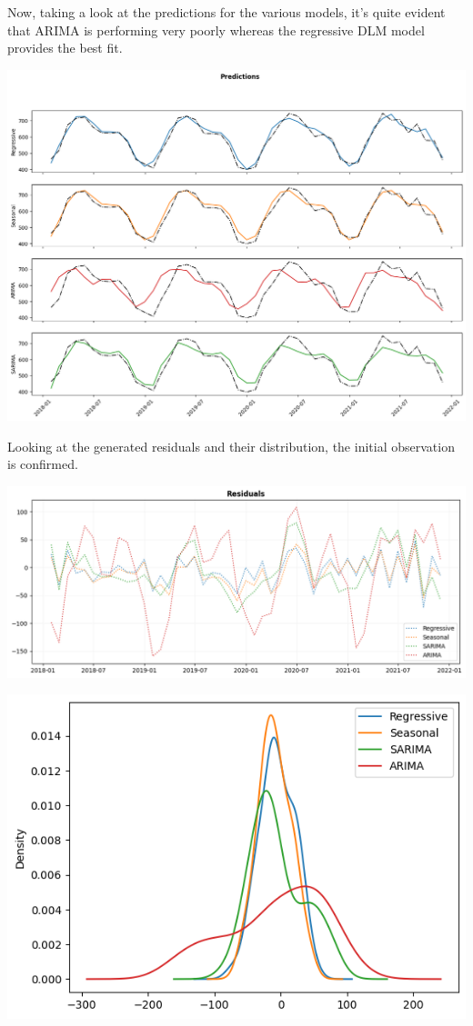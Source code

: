 \documentclass[a4paper,12pt]{article}
\begin{document}
Now, taking a look at the predictions for the various models, it's quite evident that ARIMA is performing very poorly whereas the regressive DLM model provides the best fit.

\begin{center}
\includegraphics[width=1.00\textwidth]{./images/bhadla/monthlyPred.png}
\end{center}

Looking at the generated residuals and their distribution, the initial observation is confirmed.

\begin{center}
\includegraphics[width=1.00\textwidth]{./images/bhadla/monthlyResid.png}
\end{center}

\begin{center}
\includegraphics[width=0.8\linewidth]{./images/bhadla/monthlyDist.png}
\end{center}
\end{document}
